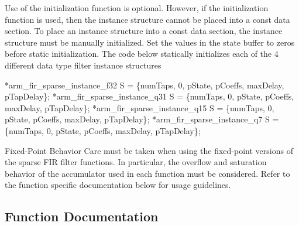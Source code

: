 \begin{DoxyParagraph}{}
Use of the initialization function is optional. However, if the initialization function is used, then the instance structure cannot be placed into a const data section. To place an instance structure into a const data section, the instance structure must be manually initialized. Set the values in the state buffer to zeros before static initialization. The code below statically initializes each of the 4 different data type filter instance structures 
\begin{DoxyPre}
*arm\_fir\_sparse\_instance\_f32 S = \{numTaps, 0, pState, pCoeffs, maxDelay, pTapDelay\};
*arm\_fir\_sparse\_instance\_q31 S = \{numTaps, 0, pState, pCoeffs, maxDelay, pTapDelay\};
*arm\_fir\_sparse\_instance\_q15 S = \{numTaps, 0, pState, pCoeffs, maxDelay, pTapDelay\};
*arm\_fir\_sparse\_instance\_q7 S =  \{numTaps, 0, pState, pCoeffs, maxDelay, pTapDelay\};
  \end{DoxyPre}
 
\end{DoxyParagraph}
\begin{DoxyParagraph}{}

\end{DoxyParagraph}
\begin{DoxyParagraph}{Fixed-\/\+Point Behavior}
Care must be taken when using the fixed-\/point versions of the sparse F\+IR filter functions. In particular, the overflow and saturation behavior of the accumulator used in each function must be considered. Refer to the function specific documentation below for usage guidelines. 
\end{DoxyParagraph}


\subsection{Function Documentation}
